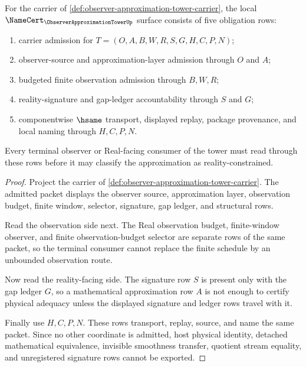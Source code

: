 \begin{theorem}
\label{thm:observer-approximation-tower-namecert-obligations}
For the carrier of \autoref{def:observer-approximation-tower-carrier}, the local $\NameCert_{\ObserverApproximationTowerUp}$ surface consists of five obligation rows:
\begin{enumerate}
\item carrier admission for $T=(O,A,B,W,R,S,G,H,C,P,N)$;
\item observer-source and approximation-layer admission through $O$ and $A$;
\item budgeted finite observation admission through $B,W,R$;
\item reality-signature and gap-ledger accountability through $S$ and $G$;
\item componentwise $\hsame$ transport, displayed replay, package provenance, and local naming through $H,C,P,N$.
\end{enumerate}
Every terminal observer or Real-facing consumer of the tower must read through these rows before it may classify the approximation as reality-constrained.
\end{theorem}
\begin{proof}
Project the carrier of \autoref{def:observer-approximation-tower-carrier}. The admitted packet displays the observer source, approximation layer, observation budget, finite window, selector, signature, gap ledger, and structural rows.

Read the observation side next. The Real observation budget, finite-window observer, and finite observation-budget selector are separate rows of the same packet, so the terminal consumer cannot replace the finite schedule by an unbounded observation route.

Now read the reality-facing side. The signature row $S$ is present only with the gap ledger $G$, so a mathematical approximation row $A$ is not enough to certify physical adequacy unless the displayed signature and ledger rows travel with it.

Finally use $H,C,P,N$. These rows transport, replay, source, and name the same packet. Since no other coordinate is admitted, host physical identity, detached mathematical equivalence, invisible smoothness transfer, quotient stream equality, and unregistered signature rows cannot be exported.
\end{proof}

